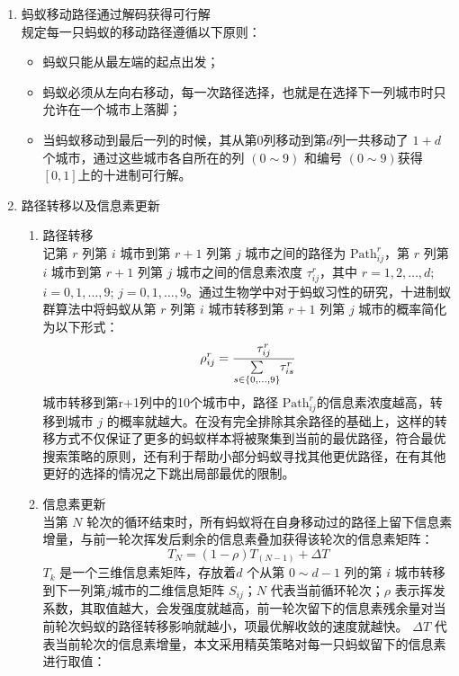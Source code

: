 \documentclass[../main.tex]{subfiles}
\begin{document}
\begin{enumerate}
\item 蚂蚁移动路径通过解码获得可行解\\
规定每一只蚂蚁的移动路径遵循以下原则：
\begin{itemize}
\item 蚂蚁只能从最左端的起点出发；
\item 蚂蚁必须从左向右移动，每一次路径选择，也就是在选择下一列城市时只允许在一个城市上落脚；
\item 当蚂蚁移动到最后一列的时候，其从第0列移动到第\(d\)列一共移动了 \(1 + d\) 个城市，通过这些城市各自所在的列 \((0 {\sim} 9)\) 和编号 \(( 0 {\sim} 9)\)获得 \([0,1]\)上的十进制可行解。
\end{itemize}
%
\item 路径转移以及信息素更新
\begin{enumerate}
\item 路径转移\\
记第 \(r\) 列第 \(i\) 城市到第 \(r+ 1\) 列第 \(j\) 城市之间的路径为 \(\mathrm{Path} _{ij} ^{r}\)，第 \(r\) 列第 \(i\) 城市到第 \(r+ 1\) 列第 \(j\) 城市之间的信息素浓度 \(\tau ^{r} _{ij}\)，其中 \(r = 1, 2, \dots , d\); \(i = 0, 1 , \dots , 9\); \(j = 0 , 1 , \dots , 9\)。通过生物学中对于蚂蚁习性的研究，十进制蚁群算法中将蚂蚁从第 \(r\) 列第 \(i\) 城市转移到第 \(r+1\) 列第 \(j\) 城市的概率简化为以下形式：
\begin{equation}\label{equ:pass1}
\rho _{ij} ^{r} = \frac{\tau ^{r} _{ij}}{\sum\limits_{s\in \{0 , \dots , 9\}} \kern -2pt\tau ^{r} _{is}}
\end{equation}
城市转移到第r+1列中的10个城市中，路径 \(\mathrm{Path}_{ij} ^{r}\)的信息素浓度越高，转移到城市 \(j\) 的概率就越大。在没有完全排除其余路径的基础上，这样的转移方式不仅保证了更多的蚂蚁样本将被聚集到当前的最优路径，符合最优搜索策略的原则，还有利于帮助小部分蚂蚁寻找其他更优路径，在有其他更好的选择的情况之下跳出局部最优的限制。
\item 信息素更新\\
当第 \(N\) 轮次的循环结束时，所有蚂蚁将在自身移动过的路径上留下信息素增量，与前一轮次挥发后剩余的信息素叠加获得该轮次的信息素矩阵：
\begin{equation}\label{equ:shit}
T_{N} = (1 - \rho) T _{(N- 1)} + \Delta T
\end{equation}
\(T_{k}\) 是一个三维信息素矩阵，存放着\(d\) 个从第 \(0{\sim} d -1\) 列的第 \(i\) 城市转移到下一列第\(j\)城市的二维信息矩阵 \(S_{ij}\)；\(N\) 代表当前循环轮次；\(\rho\) 表示挥发系数，其取值越大，会发强度就越高，前一轮次留下的信息素残余量对当前轮次蚂蚁的路径转移影响就越小，项最优解收敛的速度就越快。
\(\Delta T\) 代表当前轮次的信息素增量，本文采用精英策略对每一只蚂蚁留下的信息素进行取值： 


\end{enumerate}
\end{enumerate}
\end{document}
